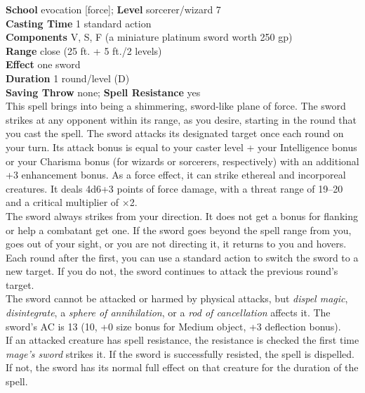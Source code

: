 \textbf{School} evocation [force]; \textbf{Level} sorcerer/wizard 7\\
\textbf{Casting Time} 1 standard action\\
\textbf{Components} V, S, F (a miniature platinum sword worth 250 gp)\\
\textbf{Range} close (25 ft. + 5 ft./2 levels)\\
\textbf{Effect} one sword\\
\textbf{Duration} 1 round/level (D)\\
\textbf{Saving Throw} none; \textbf{Spell Resistance} yes\\
This spell brings into being a shimmering, sword-like plane of force. The sword strikes at any opponent within its range, as you desire, starting in the round that you cast the spell. The sword attacks its designated target once each round on your turn. Its attack bonus is equal to your caster level + your Intelligence bonus or your Charisma bonus (for wizards or sorcerers, respectively) with an additional +3 enhancement bonus. As a force effect, it can strike ethereal and incorporeal creatures. It deals 4d6+3 points of force damage, with a threat range of 19--20 and a critical multiplier of ×2.\\
The sword always strikes from your direction. It does not get a bonus for flanking or help a combatant get one. If the sword goes beyond the spell range from you, goes out of your sight, or you are not directing it, it returns to you and hovers.\\
Each round after the first, you can use a standard action to switch the sword to a new target. If you do not, the sword continues to attack the previous round's target.\\
The sword cannot be attacked or harmed by physical attacks, but \textit{dispel magic}, \textit{disintegrate}, a \textit{sphere of annihilation}, or a \textit{rod of cancellation }affects it. The sword's AC is 13 (10, +0 size bonus for Medium object, +3 deflection bonus).\\
If an attacked creature has spell resistance, the resistance is checked the first time \textit{mage's sword }strikes it. If the sword is successfully resisted, the spell is dispelled. If not, the sword has its normal full effect on that creature for the duration of the spell.\\
